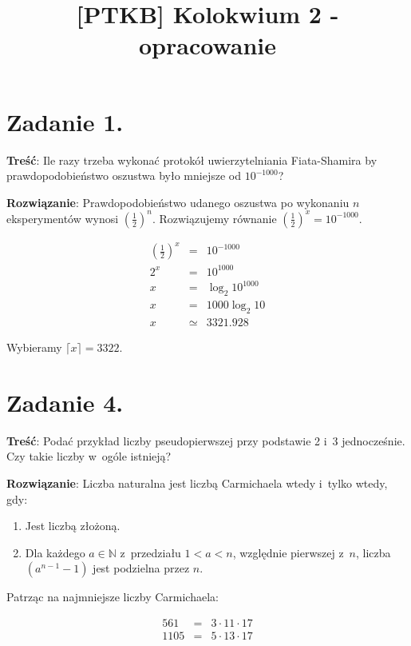 \documentclass[a4paper,10pt, twocolumn]{article}
\title{[PTKB] Kolokwium 2 - opracowanie}
\author{}
\date{}
\begin{document}
\maketitle

\section{Zadanie 1.}

\textbf{Treść}: Ile razy trzeba wykonać protokół uwierzytelniania Fiata-Shamira by prawdopodobieństwo oszustwa było mniejsze od $10^{-1000}$?

\textbf{Rozwiązanie}: Prawdopodobieństwo udanego oszustwa po wykonaniu $n$ eksperymentów wynosi $(\frac{1}{2})^{n}$. Rozwiązujemy równanie $(\frac{1}{2})^{x} = 10^{-1000}$.

\begin{equation*}
	\begin{array}{lcl} (\frac{1}{2})^{x} & = & 10^{-1000} \\ 2^{x} & = & 10^{1000} \\ x & = & \log_{2} 10^{1000} \\ x & = & 1000 \log_{2} 10 \\ x & \simeq & 3321.928 \end{array}
\end{equation*}

Wybieramy $\lceil x \rceil = 3322$.

\section{Zadanie 4.}

\textbf{Treść}: Podać przykład liczby pseudopierwszej przy podstawie 2 i~3 jednocześnie. Czy takie liczby w~ogóle istnieją?

\textbf{Rozwiązanie}: Liczba naturalna jest liczbą Carmichaela wtedy i~tylko wtedy, gdy:

\begin{enumerate}
 \item Jest liczbą złożoną.
 \item Dla każdego $a \in \mathbb{N}$ z~przedziału $1 < a < n$, względnie pierwszej z~$n$, liczba $(a^{n-1} - 1)$ jest podzielna przez $n$.
\end{enumerate}

Patrząc na najmniejsze liczby Carmichaela:

\begin{equation*}
	\begin{array}{lcl} 561& = & 3 \cdot 11 \cdot 17 \\ 1105 & = & 5 \cdot 13 \cdot 17 \\ \end{array}
\end{equation*}
\end{document}
